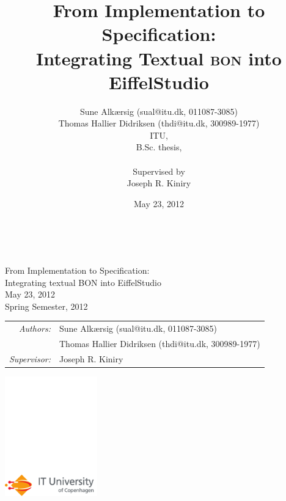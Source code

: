 \documentclass[12pt,a4paper]{report}
\author{Sune Alk\ae rsig (sual@itu.dk, 011087-3085) \\ Thomas Hallier Didriksen (thdi@itu.dk, 300989-1977)  \\ 
		ITU, \\
		B.Sc. thesis, \\ \\
		Supervised by \\
		Joseph R. Kiniry}
\title{From Implementation to Specification: \\ \large{Integrating Textual \textsc{bon} into EiffelStudio}}
\date{May 23, 2012}
\begin{document}
\begin{titlepage}
\ \\
\vspace{3cm}
\begin{center}
{\huge\sffamily
From Implementation to Specification:\\
Integrating textual BON into EiffelStudio
\\}\bigskip
{\large\sffamily
May 23, 2012
\\}
{\sffamily Spring Semester, 2012}
\end{center}
\vspace{3cm}
\large
\begin{center}
\begin{tabular}{r@{ }l}
\emph{\sffamily Authors:} & \textsf{Sune Alk\ae rsig (sual@itu.dk, 011087-3085)}\\
 & \textsf{Thomas Hallier Didriksen (thdi@itu.dk, 300989-1977)}\\
\emph{\sffamily Supervisor:} & \textsf{Joseph R. Kiniry}
\end{tabular}
\end{center}
\vfill
\includegraphics[width=4cm]{ITU_logo_ENG_horisontal}
\end{titlepage}


\tableofcontents
\listoffigures








\end{document}
